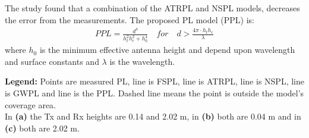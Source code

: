\large

\begin{minipage}{.45\textwidth}
The study found that a combination of the ATRPL and NSPL models, decreases the error from the measurements. The proposed PL model (PPL) is:
\vspace{-0.5em}\begin{align*}
PPL = \frac{d^4}{h_t^2 h_r^2+h_0^4}\quad for \quad d > \frac{4\pi\cdot h_th_r}{\lambda}
\end{align*}
where $h_0$ is the minimum effective antenna height and depend upon wavelength and surface constants and $\lambda$ is the wavelength.


\end{minipage}%
\hspace{1cm}
\begin{minipage}{0.45\textwidth}
\begin{center}

\end{center}
\end{minipage}

\vspace{0.5em}
\begin{minipage}{0.5\textwidth}
\begin{center}

\end{center}
\end{minipage}
\begin{minipage}{0.5\textwidth}
\begin{center}

\end{center}
\end{minipage}

\vspace{0.5em}
\textbf{Legend:} Points are measured PL, \textcolor{thomasblue}{line} is FSPL, \textcolor{thomasred}{line} is ATRPL, \textcolor{thomasgreen}{line} is NSPL, \textcolor{thomaspurple}{line} is GWPL and \textcolor{thomasyellow}{line} is the PPL. Dashed line means the point is outside the model's coverage area.\\
In \textbf{(a)} the Tx and Rx heights are 0.14 and 2.02 m, in \textbf{(b)} both are 0.04 m and in \textbf{(c)} both are 2.02 m.
